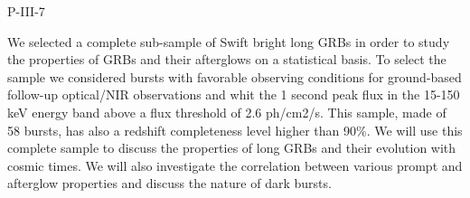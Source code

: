 P-III-7


\bigskip



\bigskip

\noindent We selected a complete sub-sample of Swift bright long GRBs in order to study the properties of GRBs and their afterglows on a statistical basis. To select the sample we considered bursts with favorable observing conditions for ground-based follow-up optical/NIR observations and whit the 1 second peak flux in the 15-150 keV energy band above a flux threshold of 2.6 ph/cm2/s. This sample, made of 58 bursts, has also a redshift completeness level higher than 90\%. We will use this complete sample to discuss the properties of long GRBs and their evolution with cosmic times. We will also investigate the correlation between various prompt and afterglow properties and discuss the nature of dark bursts.

